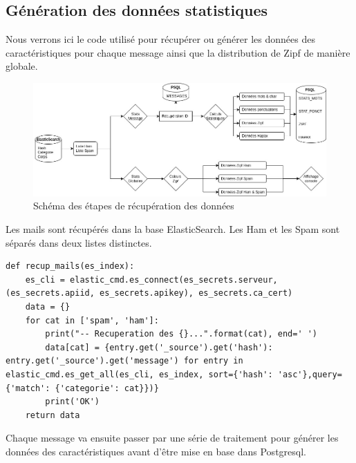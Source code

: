 \documentclass[a4paper,12pt]{article}
\begin{document}
	\subsection{Génération des données statistiques}
		Nous verrons ici le code utilisé pour récupérer ou générer les données des caractéristiques pour chaque message ainsi que la distribution de Zipf de manière globale.
		\begin{figure}[H]
			\includegraphics[width=\linewidth]{img/SchemaPhase2.jpg}
			\caption{Schéma des étapes de récupération des données}
		\end{figure}
		
		Les mails sont récupérés dans la base ElasticSearch. Les Ham et les Spam sont séparés dans deux listes distinctes.
		\begin{lstlisting}[title=Récupération des messages dans la base ES]
def recup_mails(es_index):
    es_cli = elastic_cmd.es_connect(es_secrets.serveur, (es_secrets.apiid, es_secrets.apikey), es_secrets.ca_cert)
    data = {}
    for cat in ['spam', 'ham']:
        print("-- Recuperation des {}...".format(cat), end=' ')
        data[cat] = {entry.get('_source').get('hash'): entry.get('_source').get('message') for entry in elastic_cmd.es_get_all(es_cli, es_index, sort={'hash': 'asc'},query={'match': {'categorie': cat}})}
        print('OK')
    return data		
		\end{lstlisting}
		
		Chaque message va ensuite passer par une série de traitement pour générer les données des caractéristiques avant d'être mise en base dans Postgresql. 
		
\end{document}
